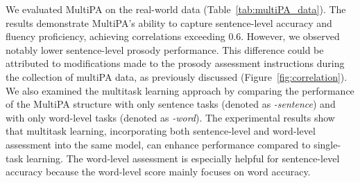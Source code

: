 \documentclass{Interspeech2024}
\begin{document}
We evaluated MultiPA on the real-world data (Table~\ref{tab:multiPA_data}). 
The results demonstrate MultiPA's ability to capture sentence-level accuracy and fluency proficiency, achieving correlations exceeding 0.6. However, we observed notably lower sentence-level prosody performance. This difference could be attributed to modifications made to the prosody assessment instructions during the collection of multiPA data, as previously discussed (Figure~\ref{fig:correlation}). We also examined the multitask learning approach by comparing the performance of the MultiPA structure with only sentence tasks (denoted as \emph{-sentence}) and with only word-level tasks (denoted as \emph{-word}). The experimental results show that multitask learning, incorporating both sentence-level and word-level assessment into the same model, can enhance performance compared to single-task learning. The word-level assessment is especially helpful for sentence-level accuracy because the word-level score mainly focuses on word accuracy. 

\begin{table}[htbp!]
\caption{Performance on multiPA data (PCC).}
\centering
{}
\label{tab:multiPA_data}
\end{table}
\end{document}
